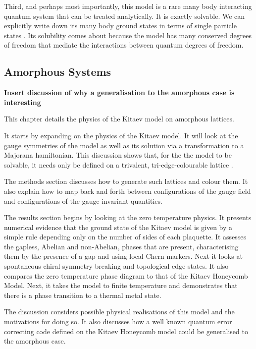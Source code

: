 Third, and perhaps most importantly, this model is a rare many body interacting quantum system that can be treated analytically. It is exactly solvable. We can explicitly write down its many body ground states in terms of single particle states \textcite{kitaevAnyonsExactlySolved2006}. Its solubility comes about because the model has many conserved degrees of freedom that mediate the interactions between quantum degrees of freedom.

\hypertarget{amorphous-systems}{%
\subsection{Amorphous Systems}\label{amorphous-systems}}

\textbf{Insert discussion of why a generalisation to the amorphous case is interesting}

This chapter details the physics of the Kitaev model on amorphous lattices.

It starts by expanding on the physics of the Kitaev model. It will look at the gauge symmetries of the model as well as its solution via a transformation to a Majorana hamiltonian. This discussion shows that, for the the model to be solvable, it needs only be defined on a trivalent, tri-edge-colourable lattice \autocite{Nussinov2009}.

The methods section discusses how to generate such lattices and colour them. It also explain how to map back and forth between configurations of the gauge field and configurations of the gauge invariant quantities.

The results section begins by looking at the zero temperature physics. It presents numerical evidence that the ground state of the Kitaev model is given by a simple rule depending only on the number of sides of each plaquette. It assesses the gapless, Abelian and non-Abelian, phases that are present, characterising them by the presence of a gap and using local Chern markers. Next it looks at spontaneous chiral symmetry breaking and topological edge states. It also compares the zero temperature phase diagram to that of the Kitaev Honeycomb Model. Next, it takes the model to finite temperature and demonstrates that there is a phase transition to a thermal metal state.

The discussion considers possible physical realisations of this model and the motivations for doing so. It also discusses how a well known quantum error correcting code defined on the Kitaev Honeycomb model could be generalised to the amorphous case.

